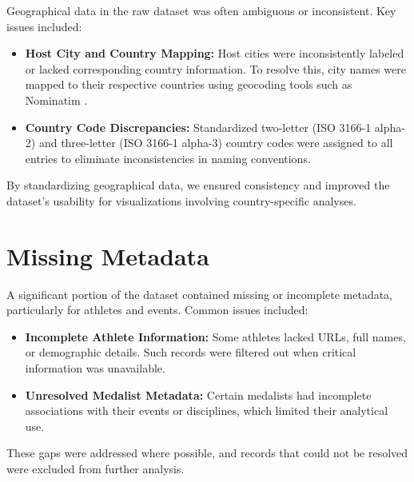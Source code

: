 Geographical data in the raw dataset was often ambiguous or inconsistent. Key issues included:

\begin{itemize}
    \item \textbf{Host City and Country Mapping:} Host cities were inconsistently labeled or lacked corresponding country information. To resolve this, city names were mapped to their respective countries using geocoding tools such as Nominatim \cite{nominatim}.
    \item \textbf{Country Code Discrepancies:} Standardized two-letter (ISO 3166-1 alpha-2) and three-letter (ISO 3166-1 alpha-3) country codes were assigned to all entries to eliminate inconsistencies in naming conventions.
\end{itemize}

By standardizing geographical data, we ensured consistency and improved the dataset's usability for visualizations involving country-specific analyses.


\section{Missing Metadata}

A significant portion of the dataset contained missing or incomplete metadata, particularly for athletes and events. Common issues included:

\begin{itemize}
    \item \textbf{Incomplete Athlete Information:} Some athletes lacked URLs, full names, or demographic details. Such records were filtered out when critical information was unavailable.
    \item \textbf{Unresolved Medalist Metadata:} Certain medalists had incomplete associations with their events or disciplines, which limited their analytical use.
\end{itemize}

These gaps were addressed where possible, and records that could not be resolved were excluded from further analysis.
